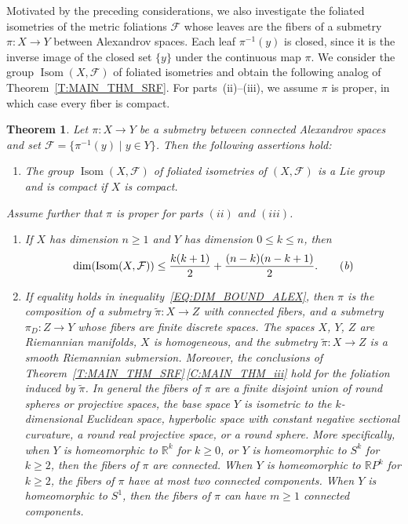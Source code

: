 \documentclass[10pt,a4paper]{amsart}
\numberwithin{equation}{section}
\newtheorem{theoremalpha}{Theorem}
\theoremstyle{definition}
\DeclareMathOperator{\Iso}{Isom}
\newcommand{\R}{\mathbb{R}} %
\newcommand{\Sp}{S} %
\newcommand{\RP}{\mathbb{R}P} %
\newcommand{\fol}{\mathcal{F}}
\newcommand{\p}{\pi}
\begin{document}
Motivated by the preceding considerations, we also investigate the foliated isometries of the metric foliations $\fol$ whose leaves are the fibers of a submetry $\pi\colon X\to Y$ between Alexandrov spaces. Each leaf $\pi^{-1}(y)$ is closed, since it is the inverse image of the closed set $\{y\}$ under the continuous map $\pi$.
We consider the group $\Iso(X,\fol)$ of foliated isometries and obtain the following analog of Theorem~\ref{T:MAIN_THM_SRF}. For parts~(ii)--(iii), we assume $\pi$ is proper, in which case every fiber is compact.


	\begin{theoremalpha}\label{T:MAIN_THM}
		Let $\pi\colon X\to Y$ be a submetry between connected Alexandrov spaces and set $\fol = \big\{\p^{-1}(y)\mid y\in Y\big\}$. Then the following assertions hold:
		\begin{enumerate}[label=$(\roman*)$]\itemsep=0pt
			\item\label{T:MAIN_THM_i} The group $\Iso(X,\fol)$ of foliated isometries of $(X,\fol)$ is a Lie group and is compact if $X$ is compact.
 \end{enumerate}
 Assume further that $\pi$ is proper for parts $(ii)$ and $(iii)$.
 \begin{enumerate}[label=$(\roman*)$]\itemsep=0pt
 \setcounter{enumi}{1}
			\item\label{T:MAIN_THM_ii}
 If $X$ has dimension $n\geq 1$ and $Y$ has dimension $0\leq k \leq n$, then
			\begin{equation}
				\dim(\Iso(X,\fol))\leq\frac{k(k+1)}{2} + \frac{(n-k)(n-k+1)}{2}.\tag{\emph{b}}\label{EQ:DIM_BOUND_ALEX}
			\end{equation}
\item\label{T:MAIN_THM_iii}If equality holds in inequality~\eqref{EQ:DIM_BOUND_ALEX}, then
$\pi$ is the composition of a submetry $\tilde{\pi}\colon X\to Z$ with connected fibers, and a submetry $\pi_D\colon Z\to Y$ whose fibers are finite discrete spaces. The spaces $X$, $Y$, $Z$ are Riemannian manifolds, $X$ is homogeneous, and the submetry $\tilde{\pi}\colon {X\to Z}$ is a smooth Riemannian submersion. Moreover, the conclusions of Theorem~\ref{T:MAIN_THM_SRF}\,\ref{C:MAIN_THM_iii} hold for the foliation induced by $\tilde{\pi}$. In general the fibers of $\pi$ are a finite disjoint union of round spheres or projective spaces, the base space $Y$ is isometric to the $k$-dimensional Euclidean space, hyperbolic space with constant negative sectional curvature, a round real projective space, or a round sphere.
More specifically, when $Y$ is homeomorphic to $\R^k$ for $k\geq0$, or $Y$ is homeomorphic to $\Sp^k$ for $k\geq 2$, then the fibers of $\pi$ are connected. When $Y$ is homeomorphic to $\RP^k$ for $k\geq 2$, the fibers of $\pi$ have at most two connected components. When $Y$ is homeomorphic to $\Sp^1$, then the fibers of $\pi$ can have $m\geq 1$ connected components. 	
\end{enumerate}
	\end{theoremalpha}
\end{document}
